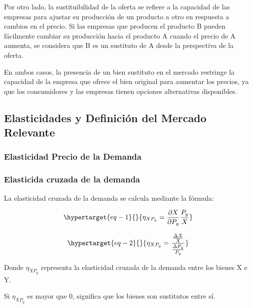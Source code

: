 \documentclass[
  a4paper,
]{article}
\begin{document}
Por otro lado, la sustituibilidad de la oferta se refiere a la capacidad
de las empresas para ajustar su producción de un producto a otro en
respuesta a cambios en el precio. Si las empresas que producen el
producto B pueden fácilmente cambiar su producción hacia el producto A
cuando el precio de A aumenta, se considera que B es un sustituto de A
desde la perspectiva de la oferta.

En ambos casos, la presencia de un bien sustituto en el mercado
restringe la capacidad de la empresa que ofrece el bien original para
aumentar los precios, ya que los consumidores y las empresas tienen
opciones alternativas disponibles.

\hypertarget{elasticidades-y-definiciuxf3n-del-mercado-relevante}{%
\subsection{Elasticidades y Definición del Mercado
Relevante}\label{elasticidades-y-definiciuxf3n-del-mercado-relevante}}

\hypertarget{elasticidad-precio-de-la-demanda}{%
\subsubsection{Elasticidad Precio de la
Demanda}\label{elasticidad-precio-de-la-demanda}}

\hypertarget{elasticida-cruzada-de-la-demanda}{%
\subsubsection{Elasticida cruzada de la
demanda}\label{elasticida-cruzada-de-la-demanda}}

La elasticidad cruzada de la demanda se calcula mediante la fórmula:

\begin{equation}\protect\hypertarget{eq-1}{}{
\eta_{XP_{y}} = \frac{\partial X}{\partial P_{y}} \frac{P_{y}}{X}
}\label{eq-1}\end{equation}

\begin{equation}\protect\hypertarget{eq-2}{}{
\eta_{XP_{y}} = \frac{\frac{\Delta X}{X}}{\frac{\Delta P_{y}}{P_{y}}}
}\label{eq-2}\end{equation}

Donde \(\eta_{XP_y}\) representa la elasticidad cruzada de la demanda
entre los bienes X e Y.

Si \(\eta_{XP_y}\) es mayor que 0, significa que los bienes son
sustitutos entre sí.
\end{document}

